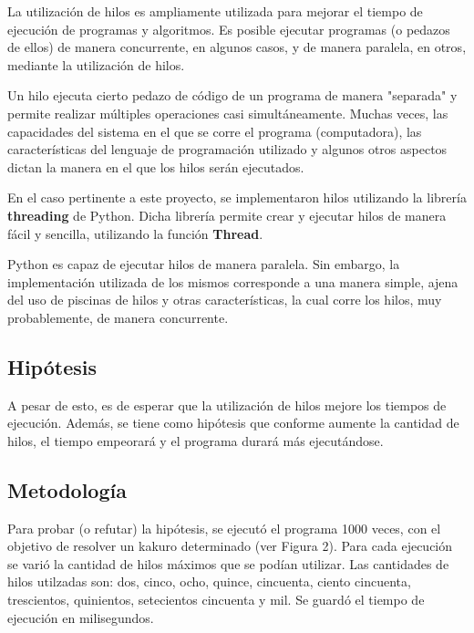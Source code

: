 \documentclass[conference]{IEEEtran}
\begin{document}
    La utilización de hilos es ampliamente utilizada para mejorar el tiempo de ejecución de programas y algoritmos. Es posible ejecutar programas (o pedazos de ellos) de manera concurrente, en algunos casos, y de manera paralela, en otros, mediante la utilización de hilos.\newline
    
    Un hilo ejecuta cierto pedazo de código de un programa de manera "separada" y permite realizar múltiples operaciones casi simultáneamente. Muchas veces, las capacidades del sistema en el que se corre el programa (computadora), las características del lenguaje de programación utilizado y algunos otros aspectos dictan la manera en el que los hilos serán ejecutados.\newline
    
    En el caso pertinente a este proyecto, se implementaron hilos utilizando la librería \textbf{threading} de Python. Dicha librería permite crear y ejecutar hilos de manera fácil y sencilla, utilizando la función \textbf{Thread}.\newline
    
    Python es capaz de ejecutar hilos de manera paralela. Sin embargo, la implementación utilizada de los mismos corresponde a una manera simple, ajena del uso de piscinas de hilos y otras características, la cual corre los hilos, muy probablemente, de manera concurrente.\newline
\subsection*{Hipótesis}

    A pesar de esto, es de esperar que la utilización de hilos mejore los tiempos de ejecución. Además, se tiene como hipótesis que conforme aumente la cantidad de hilos, el tiempo empeorará y el programa durará más ejecutándose.\newline

\subsection*{Metodología}

    Para probar (o refutar) la hipótesis, se ejecutó el programa 1000 veces, con el objetivo de resolver un kakuro determinado (ver Figura 2). Para cada ejecución se varió la cantidad de hilos máximos que se podían utilizar. Las cantidades de hilos utilzadas son: dos, cinco, ocho, quince, cincuenta, ciento cincuenta, trescientos, quinientos, setecientos cincuenta y mil. Se guardó el tiempo de ejecución en milisegundos.\newline
    
\end{document}

